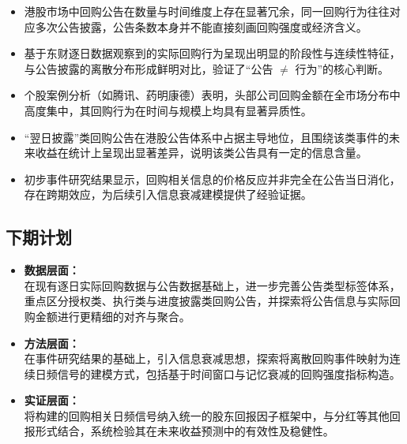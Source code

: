 \documentclass[a4paper,10pt]{article}
\begin{document}
\begin{itemize}
    \item 港股市场中回购公告在数量与时间维度上存在显著冗余，同一回购行为往往对应多次公告披露，公告条数本身并不能直接刻画回购强度或经济含义。
    
    \item 基于东财逐日数据观察到的实际回购行为呈现出明显的阶段性与连续性特征，与公告披露的离散分布形成鲜明对比，验证了“公告 $\neq$ 行为”的核心判断。
    
    \item 个股案例分析（如腾讯、药明康德）表明，头部公司回购金额在全市场分布中高度集中，其回购行为在时间与规模上均具有显著异质性。
    
    \item “翌日披露”类回购公告在港股公告体系中占据主导地位，且围绕该类事件的未来收益在统计上呈现出显著差异，说明该类公告具有一定的信息含量。
    
    \item 初步事件研究结果显示，回购相关信息的价格反应并非完全在公告当日消化，存在跨期效应，为后续引入信息衰减建模提供了经验证据。
\end{itemize}


\subsection{下期计划}

\begin{itemize}
    \item \textbf{数据层面：}\\
    在现有逐日实际回购数据与公告数据基础上，进一步完善公告类型标签体系，重点区分授权类、执行类与进度披露类回购公告，并探索将公告信息与实际回购金额进行更精细的对齐与聚合。

    \item \textbf{方法层面：}\\
    在事件研究结果的基础上，引入信息衰减思想，探索将离散回购事件映射为连续日频信号的建模方式，包括基于时间窗口与记忆衰减的回购强度指标构造。

    \item \textbf{实证层面：}\\
    将构建的回购相关日频信号纳入统一的股东回报因子框架中，与分红等其他回报形式结合，系统检验其在未来收益预测中的有效性及稳健性。
\end{itemize}
\end{document}
